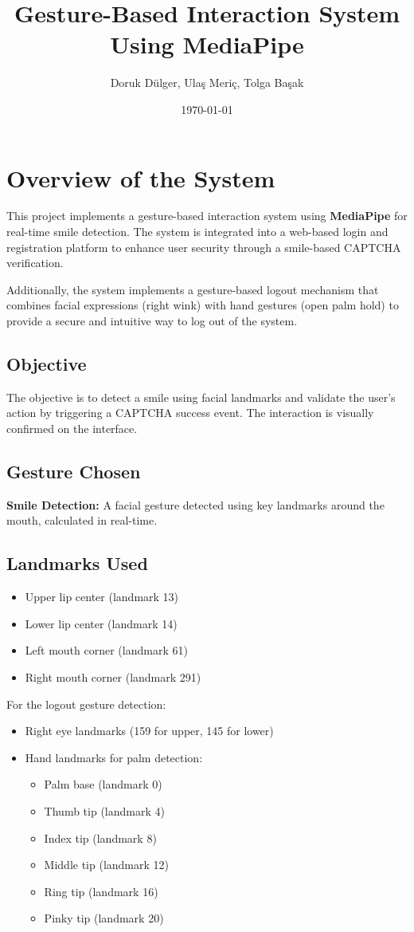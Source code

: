 \documentclass[12pt]{article}
\title{Gesture-Based Interaction System Using MediaPipe}
\author{Doruk Dülger, Ulaş Meriç, Tolga Başak}
\date{\today}
\begin{document}
\maketitle

\section{Overview of the System}
This project implements a gesture-based interaction system using \textbf{MediaPipe} for real-time smile detection. The system is integrated into a web-based login and registration platform to enhance user security through a smile-based CAPTCHA verification.

Additionally, the system implements a gesture-based logout mechanism that combines facial expressions (right wink) with hand gestures (open palm hold) to provide a secure and intuitive way to log out of the system.

\subsection{Objective}
The objective is to detect a smile using facial landmarks and validate the user's action by triggering a CAPTCHA success event. The interaction is visually confirmed on the interface.

\subsection{Gesture Chosen}
\textbf{Smile Detection:} A facial gesture detected using key landmarks around the mouth, calculated in real-time.

\subsection{Landmarks Used}
\begin{itemize}
    \item Upper lip center (landmark 13)
    \item Lower lip center (landmark 14)
    \item Left mouth corner (landmark 61)
    \item Right mouth corner (landmark 291)
\end{itemize}

For the logout gesture detection:
\begin{itemize}
    \item Right eye landmarks (159 for upper, 145 for lower)
    \item Hand landmarks for palm detection:
        \begin{itemize}
            \item Palm base (landmark 0)
            \item Thumb tip (landmark 4)
            \item Index tip (landmark 8)
            \item Middle tip (landmark 12)
            \item Ring tip (landmark 16)
            \item Pinky tip (landmark 20)
        \end{itemize}
\end{itemize}
\end{document}
